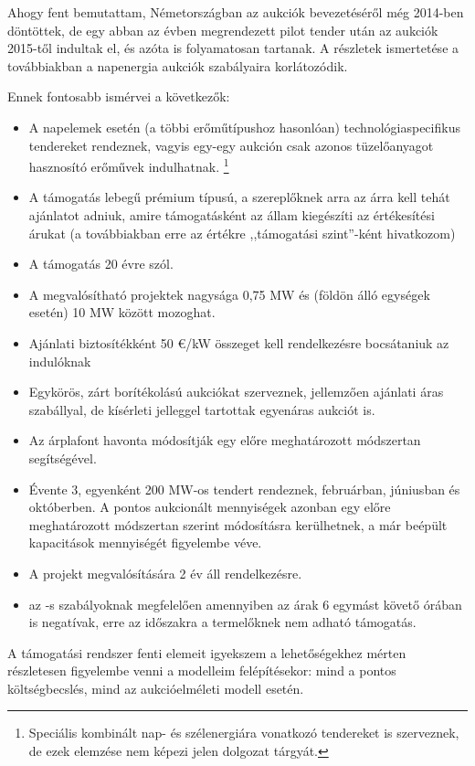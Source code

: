 \documentclass[twoside, magyar, showtrims]{corvinusphd}
\theoremstyle{plain}
\theoremstyle{remark}
\theoremstyle{definition}
\begin{document}
Ahogy fent bemutattam, Németországban
az aukciók bevezetéséről még 2014-ben döntöttek,
de egy abban az évben megrendezett pilot tender
után az aukciók 2015-től indultak el,
és azóta is folyamatosan tartanak. A részletek
ismertetése a továbbiakban a napenergia
aukciók szabályaira korlátozódik.

Ennek fontosabb ismérvei a következők:

\begin{itemize}

\item
A napelemek esetén (a többi erőműtípushoz hasonlóan) technológiaspecifikus
tendereket rendeznek, vagyis egy-egy aukción csak azonos tüzelőanyagot
hasznosító erőművek indulhatnak. \footnote{Speciális kombinált nap- és szélenergiára
vonatkozó tendereket is szerveznek, de ezek elemzése nem képezi jelen dolgozat tárgyát.}
\item
A támogatás lebegű prémium típusú, 
a szereplőknek arra az árra kell tehát ajánlatot adniuk, amire támogatásként
az állam kiegészíti az értékesítési árukat (a továbbiakban erre az értékre
,,támogatási szint''-ként hivatkozom)
\item
A támogatás 20 évre szól. 
\item
A megvalósítható projektek nagysága 0,75 MW és (földön álló egységek esetén) 10 MW között mozoghat.
\item
Ajánlati biztosítékként
50 €/kW összeget kell rendelkezésre bocsátaniuk az indulóknak
\item
Egykörös, zárt borítékolású aukciókat szerveznek, jellemzően ajánlati áras szabállyal,
de kísérleti jelleggel tartottak egyenáras aukciót is.
\item
Az árplafont havonta módosítják egy előre meghatározott módszertan segítségével.
\item
Évente 3, egyenként 200 MW-os tendert rendeznek, februárban, júniusban és októberben.
A pontos aukcionált mennyiségek azonban egy előre meghatározott módszertan
szerint módosításra kerülhetnek, a már beépült kapacitások mennyiségét figyelembe véve.
\item
A projekt megvalósítására 2 év áll rendelkezésre.
\item
az -s szabályoknak megfelelően amennyiben az árak
6 egymást követő órában is negatívak, erre az időszakra
a termelőknek nem adható támogatás.
\end{itemize}

A támogatási rendszer fenti elemeit igyekszem
a lehetőségekhez mérten részletesen figyelembe venni
a modelleim felépítésekor: mind a pontos költségbecslés,
mind az aukcióelméleti modell esetén.
\end{document}
